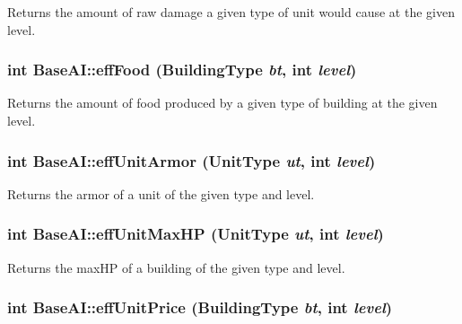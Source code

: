 Returns the amount of raw damage a given type of unit would cause at the given level. \hypertarget{classBaseAI_ec102e33572b1f58df437260bf73141e}{
\subsubsection[{effFood}]{\setlength{\rightskip}{0pt plus 5cm}int BaseAI::effFood ({\bf BuildingType} {\em bt}, \/  int {\em level})}}
\label{classBaseAI_ec102e33572b1f58df437260bf73141e}


Returns the amount of food produced by a given type of building at the given level. \hypertarget{classBaseAI_b08916c060ca84af1c0ba12e8ec9d54c}{
\subsubsection[{effUnitArmor}]{\setlength{\rightskip}{0pt plus 5cm}int BaseAI::effUnitArmor ({\bf UnitType} {\em ut}, \/  int {\em level})}}
\label{classBaseAI_b08916c060ca84af1c0ba12e8ec9d54c}


Returns the armor of a unit of the given type and level. \hypertarget{classBaseAI_0977f4ba22e8b97f89d7b0c03941c788}{
\subsubsection[{effUnitMaxHP}]{\setlength{\rightskip}{0pt plus 5cm}int BaseAI::effUnitMaxHP ({\bf UnitType} {\em ut}, \/  int {\em level})}}
\label{classBaseAI_0977f4ba22e8b97f89d7b0c03941c788}


Returns the maxHP of a building of the given type and level. \hypertarget{classBaseAI_5995a3d005840158948db900a312092c}{
\subsubsection[{effUnitPrice}]{\setlength{\rightskip}{0pt plus 5cm}int BaseAI::effUnitPrice ({\bf BuildingType} {\em bt}, \/  int {\em level})}}
\label{classBaseAI_5995a3d005840158948db900a312092c}



